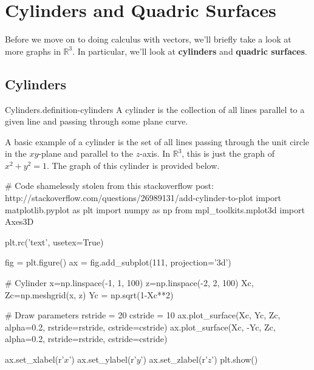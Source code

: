 \documentclass[10pt,]{book}
\newcommand{\terminology}[1]{\textbf{#1}}
\numberwithin{equation}{section}
\newcommand{\RR}{\mathbb{R}}
\begin{document}
\section[{Cylinders and Quadric Surfaces}]{Cylinders and Quadric Surfaces}\label{section-cylinders-and-quadric-surfaces}
\begin{introduction}{}%
\hypertarget{p-1234}{}%
Before we move on to doing calculus with vectors, we'll briefly take a look at more graphs in \(\RR^{3}\). In particular, we'll look at \terminology{cylinders} and \terminology{quadric surfaces}.%
\end{introduction}%
%
%
\typeout{************************************************}
\typeout{************************************************}
%
\subsection[{Cylinders}]{Cylinders}\label{subsection-cylinders}
\begin{definition}{Cylinders.}{definition-cylinders}%
\hypertarget{p-1235}{}%
A cylinder is the collection of all lines parallel to a given line and passing through some plane curve.%
\end{definition}
\hypertarget{p-1236}{}%
A basic example of a cylinder is the set of all lines passing through the unit circle in the \(xy\)-plane and parallel to the \(z\)-axis. In \(\RR^{3}\), this is just the graph of \(x^{2}+y^{2}=1\). The graph of this cylinder is provided below.%
\begin{sageinput}
# Code shamelessly stolen from this stackoverflow post: http://stackoverflow.com/questions/26989131/add-cylinder-to-plot
import matplotlib.pyplot as plt
import numpy as np
from mpl_toolkits.mplot3d import Axes3D

plt.rc('text', usetex=True)

fig = plt.figure()
ax = fig.add_subplot(111, projection='3d')

# Cylinder
x=np.linspace(-1, 1, 100)
z=np.linspace(-2, 2, 100)
Xc, Zc=np.meshgrid(x, z)
Yc = np.sqrt(1-Xc**2)

# Draw parameters
rstride = 20
cstride = 10
ax.plot_surface(Xc, Yc, Zc, alpha=0.2, rstride=rstride, cstride=cstride)
ax.plot_surface(Xc, -Yc, Zc, alpha=0.2, rstride=rstride, cstride=cstride)

ax.set_xlabel(r'$x$')
ax.set_ylabel(r'$y$')
ax.set_zlabel(r'$z$')
plt.show()
\end{sageinput}
\hypertarget{p-1237}{}%
\end{document}
